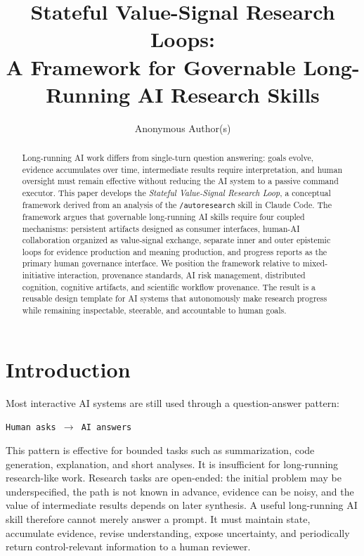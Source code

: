 \documentclass[11pt]{article}
\title{Stateful Value-Signal Research Loops:\\A Framework for Governable Long-Running AI Research Skills}
\author{Anonymous Author(s)}
\date{}
\begin{document}
\maketitle

\begin{abstract}
Long-running AI work differs from single-turn question answering: goals evolve, evidence accumulates over time, intermediate results require interpretation, and human oversight must remain effective without reducing the AI system to a passive command executor. This paper develops the \textit{Stateful Value-Signal Research Loop}, a conceptual framework derived from an analysis of the \texttt{/autoresearch} skill in Claude Code. The framework argues that governable long-running AI skills require four coupled mechanisms: persistent artifacts designed as consumer interfaces, human-AI collaboration organized as value-signal exchange, separate inner and outer epistemic loops for evidence production and meaning production, and progress reports as the primary human governance interface. We position the framework relative to mixed-initiative interaction, provenance standards, AI risk management, distributed cognition, cognitive artifacts, and scientific workflow provenance. The result is a reusable design template for AI systems that autonomously make research progress while remaining inspectable, steerable, and accountable to human goals.
\end{abstract}

\section{Introduction}

Most interactive AI systems are still used through a question-answer pattern:

\begin{center}
\texttt{Human asks $\rightarrow$ AI answers}
\end{center}

This pattern is effective for bounded tasks such as summarization, code generation, explanation, and short analyses. It is insufficient for long-running research-like work. Research tasks are open-ended: the initial problem may be underspecified, the path is not known in advance, evidence can be noisy, and the value of intermediate results depends on later synthesis. A useful long-running AI skill therefore cannot merely answer a prompt. It must maintain state, accumulate evidence, revise understanding, expose uncertainty, and periodically return control-relevant information to a human reviewer.
\end{document}
